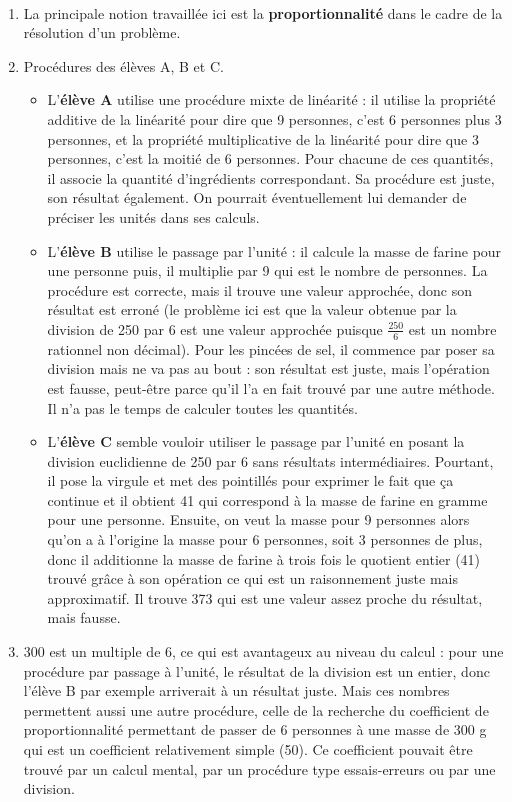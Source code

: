 \begin{corrige}
\ \\ [-5mm]
\begin{enumerate}
   \item La principale notion travaillée ici est la \textbf{proportionnalité} dans le cadre de la résolution d'un problème.
   \item Procédures des élèves A, B et C.
   \begin{itemize}
      \item L'\textbf{élève A} utilise une procédure mixte de linéarité : il utilise la propriété additive de la linéarité pour dire que 9 personnes, c'est 6 personnes plus 3 personnes, et la propriété multiplicative de la linéarité pour dire que 3 personnes, c'est la moitié de 6 personnes. Pour chacune de ces quantités, il associe la quantité d'ingrédients correspondant. Sa procédure est juste, son résultat également. On pourrait éventuellement lui demander de préciser les unités dans ses calculs.
      \item L'\textbf{élève B} utilise le passage par l'unité : il calcule la masse de farine pour une personne puis, il multiplie par 9 qui est le nombre de personnes. La procédure est correcte, mais il trouve une valeur approchée, donc son résultat est erroné (le problème ici est que la valeur obtenue par la division de 250 par 6 est une valeur approchée puisque $\frac{250}{6}$ est un nombre rationnel non décimal). Pour les pincées de sel, il commence par poser sa division mais ne va pas au bout : son résultat est juste, mais l'opération est fausse, peut-être parce qu'il l'a en fait trouvé par une autre méthode. Il n'a pas le temps de calculer toutes les quantités.
      \item L'\textbf{élève C} semble vouloir utiliser le passage par l'unité en posant la division euclidienne de 250 par 6 sans résultats intermédiaires. Pourtant, il pose la virgule et met des pointillés pour exprimer le fait que \og ça continue \fg{} et il obtient 41 qui correspond à la masse de farine en gramme pour une personne. Ensuite, on veut la masse pour 9 personnes alors qu'on a à l'origine la masse pour 6 personnes, soit 3 personnes de plus, donc il additionne la masse de farine à trois fois le quotient entier (41) trouvé grâce à son opération ce qui est un raisonnement juste mais approximatif. Il trouve 373 qui est une valeur assez proche du résultat, mais fausse.
   \end{itemize}
   \item 300 est un multiple de 6, ce qui est avantageux au niveau du calcul : pour une procédure par passage à l'unité, le résultat de la division est un entier, donc l'élève B par exemple arriverait à un résultat juste. Mais ces nombres permettent aussi une autre procédure, celle de la recherche du coefficient de proportionnalité permettant de passer de 6 personnes à une masse de 300 g qui est un coefficient relativement simple (50). Ce coefficient pouvait être trouvé par un calcul mental, par un procédure type essais-erreurs ou par une division.
\end{enumerate}
\end{corrige}

